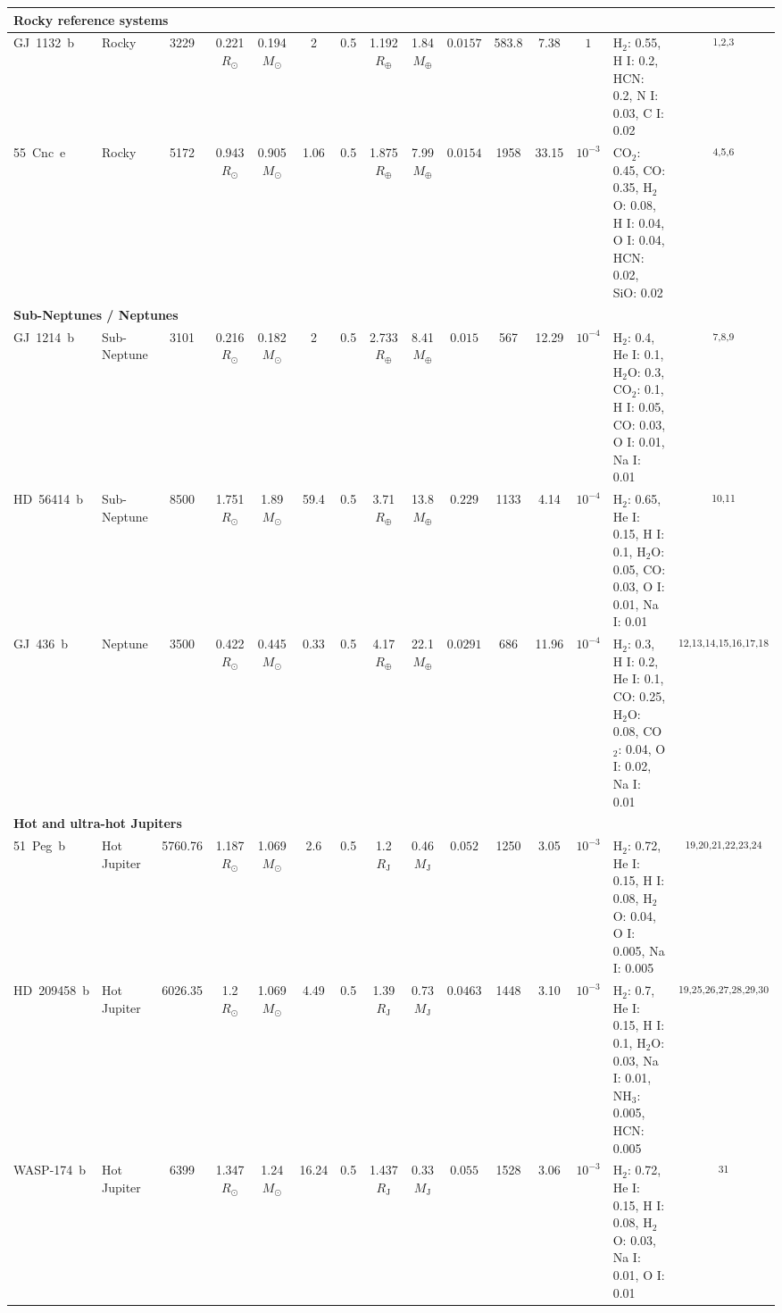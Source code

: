 \begin{landscape}
\begin{longtable}{llcccccccccccp{4.2cm}c}
\multicolumn{15}{l}{\textbf{Rocky reference systems}} \\
\midrule
GJ~1132~b & Rocky & 3229 & 0.221 $R_\odot$ & 0.194 $M_\odot$ & 2 & 0.5 & 1.192 $R_\oplus$ & 1.84 $M_\oplus$ & $0.0157$ & 583.8 & 7.38 & $1$ & H$_{2}$: 0.55, H I: 0.2, HCN: 0.2, N I: 0.03, C I: 0.02 & \textsuperscript{1,2,3} \\
55~Cnc~e & Rocky & 5172 & 0.943 $R_\odot$ & 0.905 $M_\odot$ & 1.06 & 0.5 & 1.875 $R_\oplus$ & 7.99 $M_\oplus$ & $0.0154$ & 1958 & 33.15 & $10^{-3}$ & CO$_{2}$: 0.45, CO: 0.35, H$_{2}$O: 0.08, H I: 0.04, O I: 0.04, HCN: 0.02, SiO: 0.02 & \textsuperscript{4,5,6} \\
\midrule
\multicolumn{15}{l}{\textbf{Sub-Neptunes / Neptunes}} \\
\midrule
GJ~1214~b & Sub-Neptune & 3101 & 0.216 $R_\odot$ & 0.182 $M_\odot$ & 2 & 0.5 & 2.733 $R_\oplus$ & 8.41 $M_\oplus$ & $0.015$ & 567 & 12.29 & $10^{-4}$ & H$_{2}$: 0.4, He I: 0.1, H$_{2}$O: 0.3, CO$_{2}$: 0.1, H I: 0.05, CO: 0.03, O I: 0.01, Na I: 0.01 & \textsuperscript{7,8,9} \\
HD~56414~b & Sub-Neptune & 8500 & 1.751 $R_\odot$ & 1.89 $M_\odot$ & 59.4 & 0.5 & 3.71 $R_\oplus$ & 13.8 $M_\oplus$ & $0.229$ & 1133 & 4.14 & $10^{-4}$ & H$_{2}$: 0.65, He I: 0.15, H I: 0.1, H$_{2}$O: 0.05, CO: 0.03, O I: 0.01, Na I: 0.01 & \textsuperscript{10,11} \\
GJ~436~b & Neptune & 3500 & 0.422 $R_\odot$ & 0.445 $M_\odot$ & 0.33 & 0.5 & 4.17 $R_\oplus$ & 22.1 $M_\oplus$ & $0.0291$ & 686 & 11.96 & $10^{-4}$ & H$_{2}$: 0.3, H I: 0.2, He I: 0.1, CO: 0.25, H$_{2}$O: 0.08, CO$_{2}$: 0.04, O I: 0.02, Na I: 0.01 & \textsuperscript{12,13,14,15,16,17,18} \\
\midrule
\multicolumn{15}{l}{\textbf{Hot and ultra-hot Jupiters}} \\
\midrule
51~Peg~b & Hot Jupiter & 5760.76 & 1.187 $R_\odot$ & 1.069 $M_\odot$ & 2.6 & 0.5 & 1.2 $R_\mathrm{J}$ & 0.46 $M_\mathrm{J}$ & $0.052$ & 1250 & 3.05 & $10^{-3}$ & H$_{2}$: 0.72, He I: 0.15, H I: 0.08, H$_{2}$O: 0.04, O I: 0.005, Na I: 0.005 & \textsuperscript{19,20,21,22,23,24} \\
HD~209458~b & Hot Jupiter & 6026.35 & 1.2 $R_\odot$ & 1.069 $M_\odot$ & 4.49 & 0.5 & 1.39 $R_\mathrm{J}$ & 0.73 $M_\mathrm{J}$ & $0.0463$ & 1448 & 3.10 & $10^{-3}$ & H$_{2}$: 0.7, He I: 0.15, H I: 0.1, H$_{2}$O: 0.03, Na I: 0.01, NH$_{3}$: 0.005, HCN: 0.005 & \textsuperscript{19,25,26,27,28,29,30} \\
WASP-174~b & Hot Jupiter & 6399 & 1.347 $R_\odot$ & 1.24 $M_\odot$ & 16.24 & 0.5 & 1.437 $R_\mathrm{J}$ & 0.33 $M_\mathrm{J}$ & $0.055$ & 1528 & 3.06 & $10^{-3}$ & H$_{2}$: 0.72, He I: 0.15, H I: 0.08, H$_{2}$O: 0.03, Na I: 0.01, O I: 0.01 & \textsuperscript{31} \\

\end{longtable}
\end{landscape}
